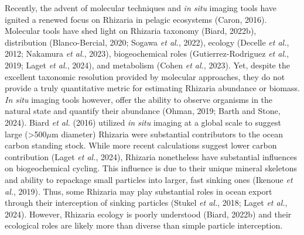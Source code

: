 \documentclass[
]{article}
\begin{document}
Recently, the advent of molecular techniques and \emph{in situ} imaging
tools have ignited a renewed focus on Rhizaria in pelagic ecosystems
(Caron, 2016). Molecular tools have shed light on Rhizaria taxonomy
(Biard, 2022b), distribution (Blanco-Bercial, 2020; Sogawa \emph{et
al.}, 2022), ecology (Decelle \emph{et al.}, 2012; Nakamura \emph{et
al.}, 2023), biogeochemical roles (Gutierrez-Rodriguez \emph{et al.},
2019; Laget \emph{et al.}, 2024), and metabolism (Cohen \emph{et al.},
2023). Yet, despite the excellent taxonomic resolution provided by
molecular approaches, they do not provide a truly quantitative metric
for estimating Rhizaria abundance or biomass. \emph{In situ} imaging
tools however, offer the ability to observe organisms in the natural
state and quantify their abundance (Ohman, 2019; Barth and Stone, 2024).
Biard \emph{et al.} (2016) utilized \emph{in situ} imaging at a global
scale to suggest large (\textgreater500\(\mu\)m diameter) Rhizaria were
substantial contributors to the ocean carbon standing stock. While more
recent calculations suggest lower carbon contribution (Laget \emph{et
al.}, 2024), Rhizaria nonetheless have substantial influences on
biogeochemical cycling. This influence is due to their unique mineral
skeletons and ability to repackage small particles into larger, fast
sinking ones (Ikenoue \emph{et al.}, 2019). Thus, some Rhizaria may play
substantial roles in ocean export through their interception of sinking
particles (Stukel \emph{et al.}, 2018; Laget \emph{et al.}, 2024).
However, Rhizaria ecology is poorly understood (Biard, 2022b) and their
ecological roles are likely more than diverse than simple particle
interception.
\end{document}
